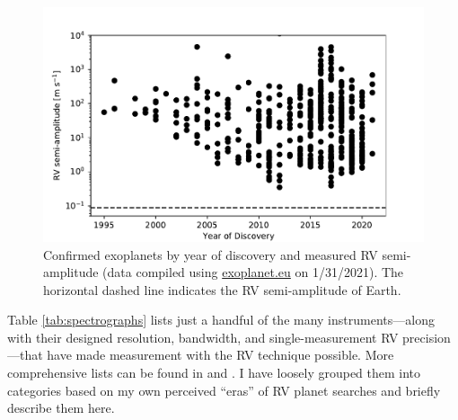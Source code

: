 \begin{figure}
    \centering
    \includegraphics[width=\textwidth]{figures-1/rv-exoplanets.pdf}
    \caption[Radial-velocity Technique Timeline -- Exoplanet discoveries by year and semi-amplitude]{Confirmed exoplanets by year of discovery and measured RV semi-amplitude (data compiled using \url{exoplanet.eu} on 1/31/2021). The horizontal dashed line indicates the RV semi-amplitude of Earth.}
    \label{fig:rv-exoplanets}
\end{figure}

Table \ref{tab:spectrographs} lists just a handful of the many instruments---along with their designed resolution, bandwidth, and single-measurement RV precision---that have made measurement with the RV technique possible. More comprehensive lists can be found in \citet{fischer_state_2016} and \citet{wright_third_2017}. I have loosely grouped them into categories based on my own perceived ``eras'' of RV planet searches and briefly describe them here.

